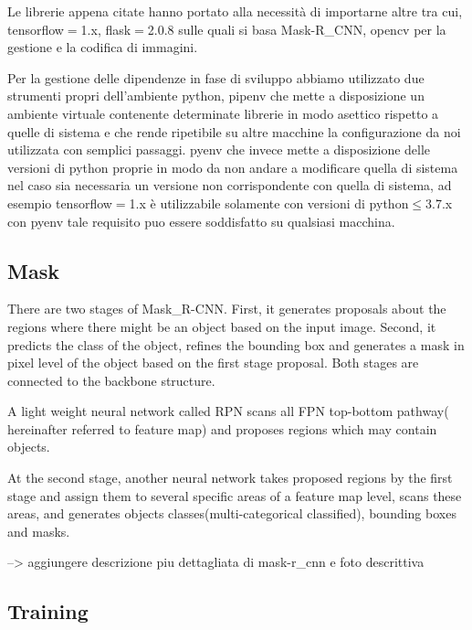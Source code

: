 \documentclass[12pt,a4paper]{article}
\begin{document}
Le librerie appena citate hanno portato alla necessità di importarne
altre tra cui, tensorflow$=$1.x, flask$=$2.0.8 sulle quali si basa
Mask-R\_CNN, opencv per la gestione e la codifica di immagini.

Per la gestione delle dipendenze in fase di sviluppo abbiamo utilizzato
due strumenti propri dell'ambiente python, pipenv che mette a
disposizione un ambiente virtuale contenente determinate librerie in
modo asettico rispetto a quelle di sistema e che rende ripetibile su
altre macchine la configurazione da noi utilizzata con semplici
passaggi. pyenv che invece mette a disposizione delle versioni di python
proprie in modo da non andare a modificare quella di sistema nel caso
sia necessaria un versione non corrispondente con quella di sistema, ad
esempio tensorflow$=$1.x è utilizzabile solamente con versioni di
python$\leq$3.7.x con pyenv tale requisito puo essere soddisfatto su
qualsiasi macchina.

\subsection{Mask}

There are two stages of Mask\_R-CNN. First, it generates proposals about
the regions where there might be an object based on the input image.
Second, it predicts the class of the object, refines the bounding box
and generates a mask in pixel level of the object based on the first
stage proposal. Both stages are connected to the backbone structure.

A light weight neural network called RPN scans all FPN top-bottom
pathway( hereinafter referred to feature map) and proposes regions which
may contain objects.

At the second stage, another neural network takes proposed regions by
the first stage and assign them to several specific areas of a feature
map level, scans these areas, and generates objects
classes(multi-categorical classified), bounding boxes and masks.

--> aggiungere descrizione piu dettagliata di mask-r\_cnn e foto descrittiva

\subsection{Training}
\end{document}
